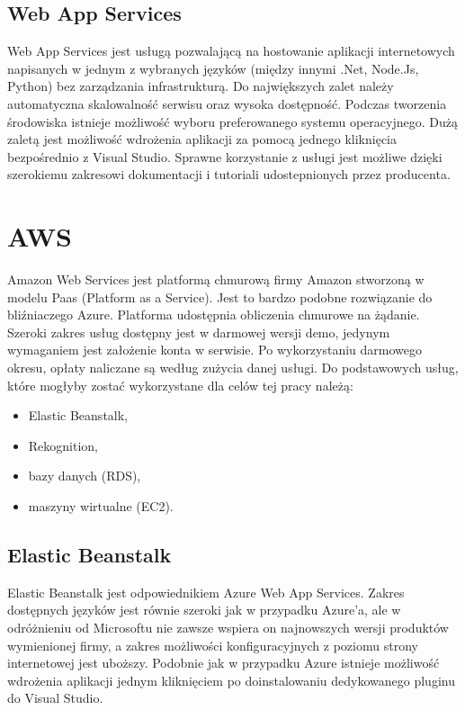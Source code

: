\subsection{Web App Services}
Web App Services jest usługą pozwalającą na hostowanie aplikacji internetowych napisanych w jednym z wybranych języków (między innymi .Net, Node.Js, Python) bez zarządzania infrastrukturą. Do największych zalet należy automatyczna skalowalność serwisu oraz wysoka dostępność. Podczas tworzenia środowiska istnieje możliwość wyboru preferowanego systemu operacyjnego. Dużą zaletą jest możliwość wdrożenia aplikacji za pomocą jednego kliknięcia bezpośrednio z Visual Studio. Sprawne korzystanie z usługi jest możliwe dzięki szerokiemu zakresowi dokumentacji i tutoriali udostepnionych przez producenta.

\section{AWS} \label{aws}
Amazon Web Services jest platformą chmurową firmy Amazon stworzoną w modelu Paas (Platform as a Service). Jest to bardzo podobne rozwiązanie do bliźniaczego Azure. Platforma udostępnia obliczenia chmurowe na żądanie. Szeroki zakres usług dostępny jest w darmowej wersji demo, jedynym wymaganiem jest założenie konta w serwisie. Po wykorzystaniu darmowego okresu, opłaty naliczane są według zużycia danej usługi. Do podstawowych usług, które mogłyby zostać wykorzystane dla celów tej pracy należą:
\begin{itemize}
    \item Elastic Beanstalk,
    \item Rekognition,
    \item bazy danych (RDS),
    \item maszyny wirtualne (EC2).
\end{itemize}
\subsection{Elastic Beanstalk}
Elastic Beanstalk jest odpowiednikiem Azure Web App Services. Zakres dostępnych języków jest równie szeroki jak w przypadku Azure'a, ale w odróżnieniu od Microsoftu nie zawsze wspiera on najnowszych wersji produktów wymienionej firmy, a zakres możliwości konfiguracyjnych z poziomu strony internetowej jest uboższy. Podobnie jak w przypadku Azure istnieje możliwość wdrożenia aplikacji jednym kliknięciem po doinstalowaniu dedykowanego pluginu do Visual Studio.
